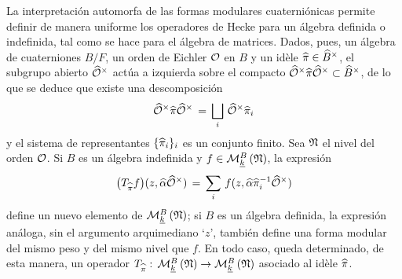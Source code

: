 La interpretaci\'{o}n automorfa de las formas modulares cuaterni\'{o}nicas
permite definir de manera uniforme los operadores de Hecke para un \'{a}lgebra
definida o indefinida, tal como se hace para el \'{a}lgebra de matrices. Dados,
pues, un \'{a}lgebra de cuaterniones $B/F$, un orden de Eichler $\cal{O}$ en
$B$ y un id\`{e}le $\hhat{\pi}\in\Idfin{B}$, el subgrupo abierto
$\Idfin{\cal{O}}$ act\'{u}a a izquierda sobre el compacto
$\Idfin{\cal{O}}\hhat{\pi}\Idfin{\cal{O}}\subset\Idfin{B}$, de lo que se deduce
que existe una descomposici\'{o}n
\begin{equation}
	\label{eq:cuaternionesdescomposiciondecoclasedobleideles}
	\Idfin{\cal{O}}\hhat{\pi}\Idfin{\cal{O}} \,=\,
		\bigsqcup_{i}\,\Idfin{\cal{O}}\hhat{\pi}_{i}
\end{equation}
%
y el sistema de representantes $\{\hhat{\pi}_{i}\}_{i}$ es un conjunto finito.
Sea $\frak{N}$ el nivel del orden $\cal{O}$. Si $B$ es un \'{a}lgebra
indefinida y $f\in\modularH[B]{k}{\frak{N}}$, la expresi\'{o}n
\begin{equation}
	\label{eq:cuaternionicasoperadorcoclase}
	\big(T_{\hhat{\pi}}f\big)(z,\hhat{\alpha}\Idfin{\cal{O}}) \,=\,
		\sum_{i}\,f(z,\hhat{\alpha}\hhat{\pi}_{i}^{-1}\Idfin{\cal{O}})
\end{equation}
%
define un nuevo elemento de $\modularH[B]{k}{\frak{N}}$; si $B$ es un
\'{a}lgebra definida, la expresi\'{o}n an\'{a}loga, sin el argumento
arquimediano `$z$', tambi\'{e}n define una forma modular del mismo peso y del
mismo nivel que $f$. En todo caso, queda determinado, de esta manera, un
operador
\begin{math}
	T_{\hhat{\pi}}:\,\modularH[B]{k}{\frak{N}}\rightarrow
		\modularH[B]{k}{\frak{N}}
\end{math}
asociado al id\`{e}le $\hhat{\pi}$.

